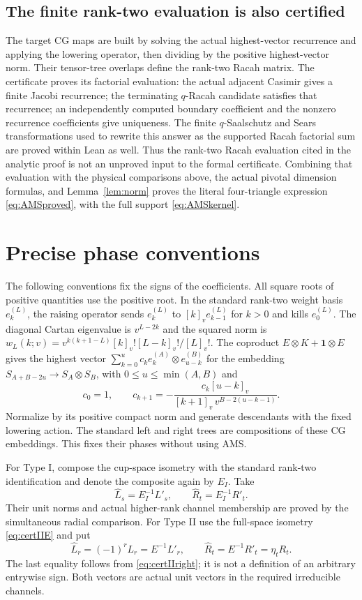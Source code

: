\documentclass[10pt,a4paper]{article}
\newcommand{\qf}[1]{[#1]_v!}
\newcommand{\id}{\mathbf 1}
\newenvironment{revision}{\begingroup}{\endgroup}
\begin{document}
\begin{revision}
\subsection{The finite rank-two evaluation is also certified}
The target CG maps are built by solving the actual highest-vector
recurrence and applying the lowering operator, then dividing by the
positive highest-vector norm. Their tensor-tree overlaps define the
rank-two Racah matrix. The certificate proves its factorial evaluation:
the actual adjacent Casimir gives a finite Jacobi recurrence; the
terminating $q$-Racah candidate satisfies that recurrence; an independently
computed boundary coefficient and the nonzero recurrence coefficients
give uniqueness. The finite $q$-Saalschutz and Sears transformations used
to rewrite this answer as the supported Racah factorial sum are proved
within Lean as well.
Thus the rank-two Racah evaluation cited in the analytic proof is not an
unproved input to the formal certificate. Combining that evaluation with
the physical comparisons above, the actual pivotal dimension formulas,
and Lemma~\ref{lem:norm} proves the literal four-triangle expression
\eqref{eq:AMSproved}, with the full support \eqref{eq:AMSkernel}.

\section{Precise phase conventions}\label{sec:phases}
The following conventions fix the signs of the coefficients. All square
roots of positive quantities use the positive root. In the standard
rank-two weight basis $e_k^{(L)}$, the raising operator sends
$e_k^{(L)}$ to $[k]_v e_{k-1}^{(L)}$ for $k>0$ and kills $e_0^{(L)}$.
The diagonal Cartan eigenvalue is $v^{L-2k}$ and the squared norm is
$w_L(k;v)=v^{k(k+1-L)}\qf{k}\qf{L-k}/\qf{L}$.
The coproduct $E\otimes K+\id\otimes E$ gives the highest vector
$\sum_{k=0}^u c_k e_k^{(A)}\otimes e_{u-k}^{(B)}$ for the embedding
$S_{A+B-2u}\to S_A\otimes S_B$, with $0\le u\le\min(A,B)$ and
\begin{equation}\label{eq:CGphase}
 c_0=1,\qquad
 c_{k+1}=-\frac{c_k[u-k]_v}
 {[k+1]_v\,v^{B-2(u-k-1)}}.
\end{equation}
Normalize by its positive compact norm and generate descendants with the
fixed lowering action. The standard left and right trees are compositions
of these CG embeddings. This fixes their phases without using AMS.

For Type I, compose the cup-space isometry with the standard rank-two
identification and denote the composite again by $E_I$. Take
\[
 \widehat L_s=E_I^{-1}L'_s,\qquad
 \widehat R_t=E_I^{-1}R'_t.
\]
Their unit norms and actual higher-rank channel membership are proved by
the simultaneous radial comparison. For Type II use the full-space
isometry \eqref{eq:certIIE} and put
\begin{equation}\label{eq:certIIgauge}
 \widehat L_r=(-1)^r L_r=E^{-1}L'_r,
 \qquad\widehat R_t=E^{-1}R'_t=\eta_tR_t.
\end{equation}
The last equality follows from \eqref{eq:certIIright}; it is not a definition
of an arbitrary entrywise sign. Both vectors are actual unit vectors in
the required irreducible channels.


\end{revision}
\end{document}
